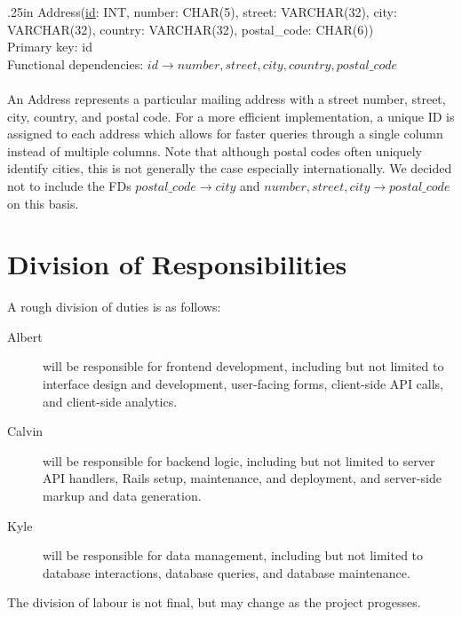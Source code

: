 \documentclass[letterpaper]{report}
\begin{document}
\hangindent .25in
{\sffamily Address(\underline{id}: INT, number: CHAR(5), street: VARCHAR(32), city: VARCHAR(32), country: VARCHAR(32), postal\_code: CHAR(6))}\\
Primary key: {\sffamily id} \\
Functional dependencies: $id \to number, street, city, country, postal\_code$ \\\\
An {\sffamily Address} represents a particular mailing address with a street number, street, city, country, and postal code. For a more efficient implementation, a unique ID is assigned to each address which allows for faster queries through a single column instead of multiple columns. Note that although postal codes often uniquely identify cities, this is not generally the case especially internationally. We decided not to include the FDs $postal\_code \to city$ and $number, street, city \to postal\_code$ on this basis.

\section*{Division of Responsibilities}
A rough division of duties is as follows:
\begin{description}
	\item[Albert] will be responsible for frontend development, including but not limited to interface design and development, user-facing forms, client-side API calls, and client-side analytics.
	\item[Calvin] will be responsible for backend logic, including but not limited to server API handlers, Rails setup, maintenance, and deployment, and server-side markup and data generation.
	\item[Kyle] will be responsible for data management, including but not limited to database interactions, database queries, and database maintenance.
\end{description}

The division of labour is not final, but may change as the project progesses.
\end{document}
